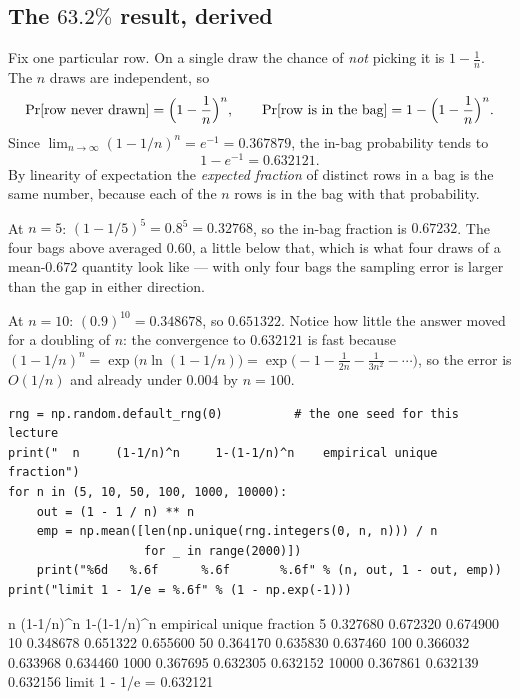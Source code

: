 \documentclass[11pt]{article}
\begin{document}
\subsection{The $63.2\%$ result, derived}
\label{sec:632}

Fix one particular row. On a single draw the chance of \emph{not} picking it
is $1 - \frac{1}{n}$. The $n$ draws are independent, so
\begin{equation}
  \Pr[\text{row never drawn}] = \Bigl(1 - \frac{1}{n}\Bigr)^{n},
  \qquad
  \Pr[\text{row is in the bag}] = 1 - \Bigl(1 - \frac{1}{n}\Bigr)^{n}.
  \label{eq:632}
\end{equation}
Since $\lim_{n\to\infty}(1 - 1/n)^n = e^{-1} = 0.367879$, the in-bag
probability tends to
\[
  1 - e^{-1} = \mathbf{0.632121}.
\]
By linearity of expectation the \emph{expected fraction} of distinct rows in
a bag is the same number, because each of the $n$ rows is in the bag with that
probability.

\begin{worked}
At $n = 5$: $(1 - 1/5)^5 = 0.8^5 = 0.32768$, so the in-bag fraction is
$0.67232$. The four bags above averaged $0.60$, a little below that, which is
what four draws of a mean-$0.672$ quantity look like --- with only four bags
the sampling error is larger than the gap in either direction.

At $n = 10$: $(0.9)^{10} = 0.348678$, so $0.651322$. Notice how little the
answer moved for a doubling of $n$: the convergence to $0.632121$ is fast
because $(1-1/n)^n = \exp\bigl(n\ln(1 - 1/n)\bigr)
= \exp\bigl(-1 - \frac{1}{2n} - \frac{1}{3n^2} - \cdots\bigr)$, so the error is
$O(1/n)$ and already under $0.004$ by $n = 100$.
\end{worked}

\begin{lstlisting}
rng = np.random.default_rng(0)          # the one seed for this lecture
print("  n     (1-1/n)^n     1-(1-1/n)^n    empirical unique fraction")
for n in (5, 10, 50, 100, 1000, 10000):
    out = (1 - 1 / n) ** n
    emp = np.mean([len(np.unique(rng.integers(0, n, n))) / n
                   for _ in range(2000)])
    print("%6d   %.6f      %.6f       %.6f" % (n, out, 1 - out, emp))
print("limit 1 - 1/e = %.6f" % (1 - np.exp(-1)))
\end{lstlisting}
\begin{codeout}
  n     (1-1/n)^n     1-(1-1/n)^n    empirical unique fraction
     5   0.327680      0.672320       0.674900
    10   0.348678      0.651322       0.655600
    50   0.364170      0.635830       0.637460
   100   0.366032      0.633968       0.634460
  1000   0.367695      0.632305       0.632152
 10000   0.367861      0.632139       0.632156
limit 1 - 1/e = 0.632121
\end{codeout}
\end{document}
